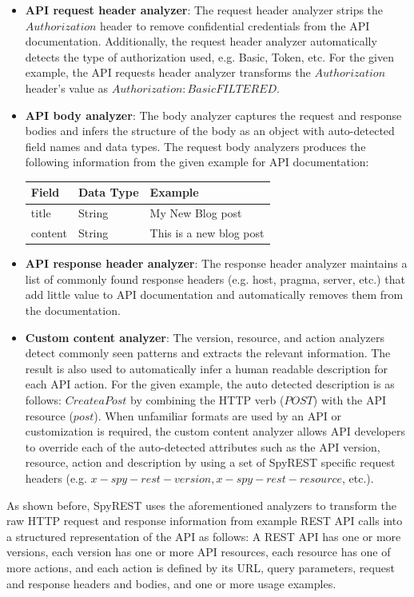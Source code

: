 \documentclass[10pt, conference]{IEEEtran}
\begin{document}
\begin{itemize}
  \item \textbf{API request header analyzer}: The request header analyzer strips the $Authorization$ header to remove confidential credentials from the API documentation. Additionally, the request header analyzer automatically detects the type of authorization used, e.g. Basic, Token, etc. For the given example, the API requests header analyzer transforms the $Authorization$ header's value as $Authorization: Basic FILTERED$.

  \item \textbf{API body analyzer}: The body analyzer captures the request and response bodies and infers the structure of the body as an object with auto-detected field names and data types. The request body analyzers produces the following information from the given example for API documentation:

  \begin{tabular}{|l | l | l|}
    \hline
    Field & Data Type & Example \\
    \hline
    title & String & My New Blog post \\
    \hline
    content & String & This is a new blog post \\
    \hline
  \end{tabular}

  \item \textbf{API response header analyzer}: The response header analyzer maintains a list of commonly found response headers (e.g. host, pragma, server, etc.) that add little value to API documentation and automatically removes them from the documentation.

  \item \textbf{Custom content analyzer}: The version, resource, and action analyzers detect commonly seen patterns and extracts the relevant information. The result is also used to automatically infer a human readable description for each API action. For the given example, the auto detected description is as follows: $Create a Post$ by combining the HTTP verb ($POST$) with the API resource ($post$). When unfamiliar formats are used by an API or customization is required, the custom content analyzer allows API developers to override each of the auto-detected attributes such as the API version, resource, action and description by using a set of SpyREST specific request headers (e.g. $x-spy-rest-version, x-spy-rest-resource$, etc.).
\end{itemize}


As shown before, SpyREST uses the aforementioned analyzers to transform the raw HTTP request and response information from example REST API calls into a structured representation of the API as follows: A REST API has one or more versions, each version has one or more API resources, each resource has one of more actions, and each action is defined by its URL, query parameters, request and response headers and bodies, and one or more usage examples.
\end{document}
